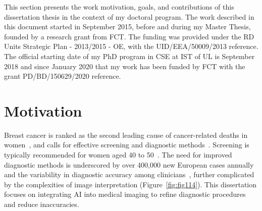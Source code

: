 \clearpage
\label{chap:chap001}
\noindent

This section presents the work motivation, goals, and contributions of this dissertation thesis in the context of my doctoral program.
The work described in this document started in September 2015, before and during my Master Thesis, founded by a research grant from \ac{FCT}.
The funding was provided under the \ac{RD} Units Strategic Plan - 2013/2015 - \ac{OE}, with the UID/EEA/50009/2013 reference.
The official starting date of my \ac{PhD} program in \ac{CSE} at \ac{IST} of \ac{UL} is September 2018 and since January 2020 that my work has been funded by \ac{FCT} with the grant PD/BD/150629/2020 reference.

\section{Motivation}
\label{sec:chap001001}

\textcolor{revised}{Breast cancer is ranked as the second leading cause of cancer-related deaths in women~\cite{doi:10.1002/cncr.32859}, and calls for effective screening and diagnostic methods~\cite{https://doi.org/10.3322/caac.21754}.
Screening is typically recommended for women aged 40 to 50~\cite{https://doi.org/10.3322/caac.21754}.
The need for improved diagnostic methods is underscored by over 400,000 new European cases annually and the variability in diagnostic accuracy among clinicians~\cite{Dafni2019}, further complicated by the complexities of image interpretation (Figure~\ref{fig:fig114}).
This dissertation focuses on integrating \ac{AI} into medical imaging to refine diagnostic procedures and reduce inaccuracies.}

